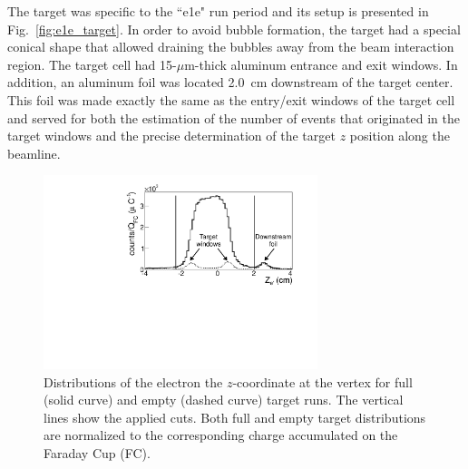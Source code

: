 \documentclass[prc,twocolumn,superscriptaddress,showpacs,amssymb,amsmath,amsfonts,aps,nofootinbib]{revtex4-1}
\begin{document}
The target was specific to the ``e1e" run period and its setup is presented in Fig.~\ref{fig:e1e_target}. 
In order to avoid bubble formation, the target had a special conical shape that allowed draining the bubbles away from the beam interaction region.
The target cell had 15-$\mu$m-thick aluminum entrance and exit windows. In addition, an aluminum foil was located 2.0~cm downstream of the target center. This foil was made exactly the same as the entry/exit windows of the target cell and served for both  the estimation of the number of events that originated in the target windows and the precise determination of the target $z$ position along the beamline.




\begin{figure}[htp]
\begin{center}
 \includegraphics[width=8cm,keepaspectratio,clip,trim={0 0 0 0}]{pictures/vertex/vertex_new.pdf}
\vspace{-0.1cm}
\caption{Distributions of the electron the $z$-coordinate at the vertex for full (solid curve) and empty (dashed curve) target runs. The vertical lines show the applied cuts. Both full and empty target distributions are normalized to the corresponding charge accumulated on the Faraday Cup (FC).}
\label{fig:zvertex}
\end{center}
\end{figure} 
\end{document}
